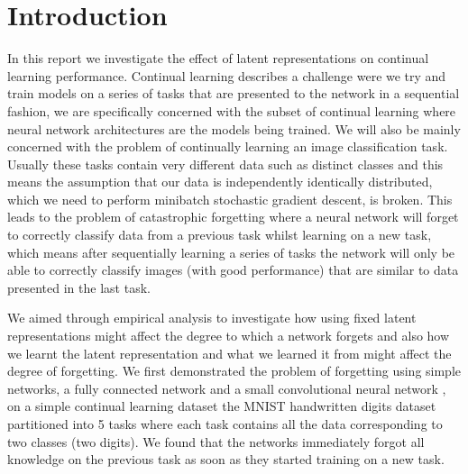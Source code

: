 \section{Introduction}
In this report we investigate the effect of latent representations on continual learning performance. Continual learning \cite{de2021continual, parisi2019continual} describes a challenge were we try and train models on a series of tasks that are presented to the network in a sequential fashion, we are specifically concerned with the subset of continual learning where neural network architectures are the models being trained. We will also be mainly concerned with the problem of continually learning an image classification task. Usually these tasks contain very different data such as distinct classes and this means the assumption that our data is independently identically distributed, which we need to perform minibatch stochastic gradient descent, is broken. This leads to the problem of catastrophic forgetting \cite{ratcliff1990catastrophic, mccloskey1989catastrophic, french1999catastrophic} where a neural network will forget to correctly classify data from a previous task whilst learning on a new task, which means after sequentially learning a series of tasks the network will only be able to correctly classify images (with good performance) that are similar to data presented in the last task. 

We aimed through empirical analysis to investigate how using fixed latent representations might affect the degree to which a network forgets and also how we learnt the latent representation and what we learned it from might affect the degree of forgetting. We first demonstrated the problem of forgetting using simple networks, a fully connected network and a small convolutional neural network \cite{lecun1995convolutional}, on a simple continual learning dataset the MNIST handwritten digits dataset \cite{deng2012mnist} partitioned into 5 tasks where each task contains all the data corresponding to two classes (two digits). We found that the networks immediately forgot all knowledge on the previous task as soon as they started training on a new task. 


